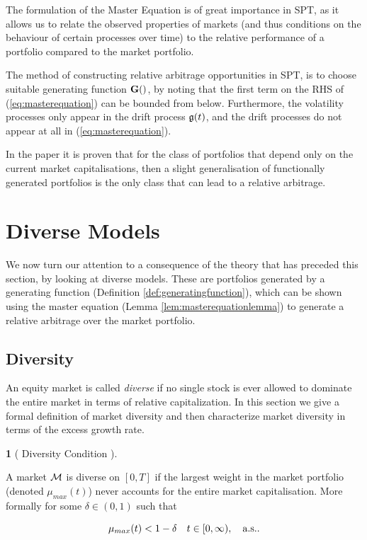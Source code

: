 \documentclass[british]{amsart} \usepackage{lmodern}
\numberwithin{equation}{section} \numberwithin{figure}{section}
\theoremstyle{plain} \newtheorem{thm}{\protect\theoremname}[section]
\theoremstyle{definition} \newtheorem{defn}[thm]{\protect\definitionname}
\theoremstyle{plain} \newtheorem{assumption}[thm]{\protect\assumptionname}
\theoremstyle{plain} \newtheorem{lem}[thm]{\protect\lemmaname}
\theoremstyle{plain} \newtheorem{prop}[thm]{\protect\propositionname}
\theoremstyle{remark} \newtheorem{rem}[thm]{\protect\remarkname}
\theoremstyle{plain} \newtheorem{cor}[thm]{\protect\corollaryname}
\begin{document}
The formulation of the Master Equation is of great importance in SPT, as it
allows us to relate the observed properties of markets (and thus conditions on
the behaviour of certain processes over time) to the relative performance of a
portfolio compared to the market portfolio. 

The method of constructing relative arbitrage opportunities in SPT, is to choose
suitable generating function $\G$, by noting that the first term on the RHS of
(\ref{eq:masterequation}) can be bounded from below. Furthermore, the volatility
processes only appear in the drift process $\mathfrak{g}(t)$, and the drift processes do not
appear at all in (\ref{eq:masterequation}).

In the paper \cite{pal2016geometry} it is proven that for the class of
portfolios that depend only on the current market capitalisations, then a slight
generalisation of functionally generated portfolios is the only class that can
lead to a relative arbitrage.

\newpage
\section{Diverse Models}

We now turn our attention to a consequence of the theory that has preceded this
section, by looking at diverse models. These are portfolios generated by a
generating function (Definition \ref{def:generatingfunction}), which can be
shown using the master equation (Lemma \ref{lem:masterequationlemma}) to
generate a relative arbitrage over the market portfolio.

\subsection{Diversity}

An equity market is called \textit{diverse} if no single stock is ever allowed
to dominate the entire market in terms of relative capitalization. In this
section we give a formal definition of market diversity and then characterize
market diversity in terms of the excess growth rate.

\begin{defn} 
  [
    {\cite[Definition 3.2]{fernholz1999diversity}}
    Diversity Condition
  ]
  \label{def:defnD}

  A market $\mathcal{M}$ is diverse on $[0,T]$ if the largest weight in the market
  portfolio (denoted $\mu_{max}(t)$) never accounts for the entire market
  capitalisation. More formally for some $\delta\in(0,1)$ such that

  \begin{equation}
    \label{eq:eqD}
      \mu_{max}(t) < 1 - \delta
    \quad t\in[0,\infty),
    \quad \text{a.s.}.
  \end{equation}

\end{defn}
\end{document}
